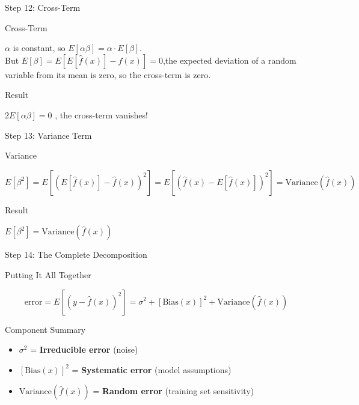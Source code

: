 \documentclass[10pt]{beamer}
\begin{document}
\begin{frame}{Step 12: Cross-Term}
\small

\begin{keypointsbox}{Cross-Term}
\raggedright
$\alpha$ is constant, so $E[\alpha\beta] = \alpha \cdot E[\beta]$.\\
But $E[\beta] = E[E[\hat{f}(x)] - \hat{f}(x)] = 0$,the expected deviation of a random variable from its mean is zero, so the cross-term is zero.
\end{keypointsbox}

\begin{alertbox}{Result}
\raggedright
$\boxed{2E[\alpha\beta] = 0}$ , the cross-term vanishes!
\end{alertbox}
\end{frame}

\begin{frame}{Step 13: Variance Term}
\small
\begin{keypointsbox}{Variance}
\raggedright
$E[\beta^2] = E[(E[\hat{f}(x)] - \hat{f}(x))^2] = E[(\hat{f}(x) - E[\hat{f}(x)])^2] = \text{Variance}(\hat{f}(x))$
\end{keypointsbox}

\begin{alertbox}{Result}
\raggedright
$\boxed{E[\beta^2] = \text{Variance}(\hat{f}(x))}$
\end{alertbox}
\end{frame}

\begin{frame}{Step 14: The Complete Decomposition}
\small
\begin{alertbox}{Putting It All Together}
\raggedright
$$\text{error}=  E[(y - \hat{f}(x))^2] = \sigma^2 + [\text{Bias}(x)]^2 + \text{Variance}(\hat{f}(x))$$
\end{alertbox}

\begin{definitionbox}{Component Summary}
\raggedright
\begin{itemize}
\item $\sigma^2$ = \textbf{Irreducible error} (noise)
\item $[\text{Bias}(x)]^2$ = \textbf{Systematic error} (model assumptions)
\item $\text{Variance}(\hat{f}(x))$ = \textbf{Random error} (training set sensitivity)
\end{itemize}
\end{definitionbox}
\end{frame}
\end{document}
